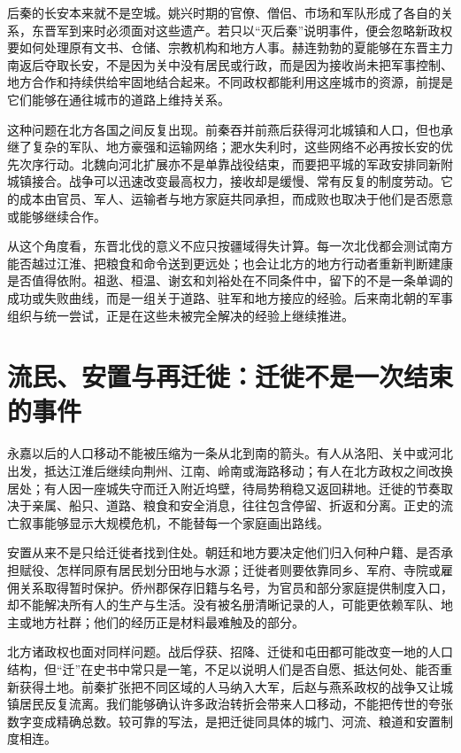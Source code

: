 后秦的长安本来就不是空城。姚兴时期的官僚、僧侣、市场和军队形成了各自的关系，东晋军到来时必须面对这些遗产。若只以“灭后秦”说明事件，便会忽略新政权要如何处理原有文书、仓储、宗教机构和地方人事。赫连勃勃的夏能够在东晋主力南返后夺取长安，不是因为关中没有居民或行政，而是因为接收尚未把军事控制、地方合作和持续供给牢固地结合起来。不同政权都能利用这座城市的资源，前提是它们能够在通往城市的道路上维持关系。

这种问题在北方各国之间反复出现。前秦吞并前燕后获得河北城镇和人口，但也承继了复杂的军队、地方豪强和运输网络；淝水失利时，这些网络不必再按长安的优先次序行动。北魏向河北扩展亦不是单靠战役结束，而要把平城的军政安排同新附城镇接合。战争可以迅速改变最高权力，接收却是缓慢、常有反复的制度劳动。它的成本由官员、军人、运输者与地方家庭共同承担，而成败也取决于他们是否愿意或能够继续合作。

从这个角度看，东晋北伐的意义不应只按疆域得失计算。每一次北伐都会测试南方能否越过江淮、把粮食和命令送到更远处；也会让北方的地方行动者重新判断建康是否值得依附。祖逖、桓温、谢玄和刘裕处在不同条件中，留下的不是一条单调的成功或失败曲线，而是一组关于道路、驻军和地方接应的经验。后来南北朝的军事组织与统一尝试，正是在这些未被完全解决的经验上继续推进。

\section{流民、安置与再迁徙：迁徙不是一次结束的事件}
\label{sec:eastern-jin-depth-repeated-migration}

永嘉以后的人口移动不能被压缩为一条从北到南的箭头。有人从洛阳、关中或河北出发，抵达江淮后继续向荆州、江南、岭南或海路移动；有人在北方政权之间改换居处；有人因一座城失守而迁入附近坞壁，待局势稍稳又返回耕地。迁徙的节奏取决于亲属、船只、道路、粮食和安全消息，往往包含停留、折返和分离。正史的流亡叙事能够显示大规模危机，不能替每一个家庭画出路线。

安置从来不是只给迁徙者找到住处。朝廷和地方要决定他们归入何种户籍、是否承担赋役、怎样同原有居民划分田地与水源；迁徙者则要依靠同乡、军府、寺院或雇佣关系取得暂时保护。侨州郡保存旧籍与名号，为官员和部分家庭提供制度入口，却不能解决所有人的生产与生活。没有被名册清晰记录的人，可能更依赖军队、地主或地方社群；他们的经历正是材料最难触及的部分。

北方诸政权也面对同样问题。战后俘获、招降、迁徙和屯田都可能改变一地的人口结构，但“迁”在史书中常只是一笔，不足以说明人们是否自愿、抵达何处、能否重新获得土地。前秦扩张把不同区域的人马纳入大军，后赵与燕系政权的战争又让城镇居民反复流离。我们能够确认许多政治转折会带来人口移动，不能把传世的夸张数字变成精确总数。较可靠的写法，是把迁徙同具体的城门、河流、粮道和安置制度相连。

